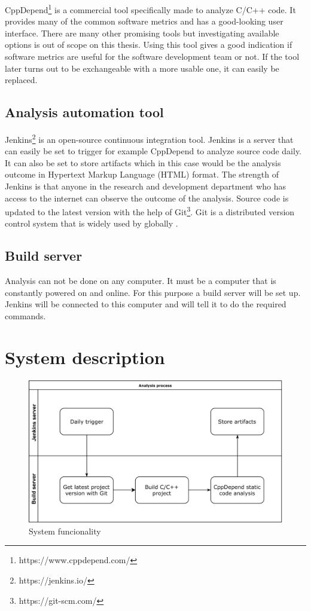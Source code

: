 CppDepend\footnote{https://www.cppdepend.com/} is a commercial tool specifically made to analyze C/C++ code. It provides many of the common software metrics and has a good-looking user interface. There are many other promising tools but investigating available options is out of scope on this thesis. Using this tool gives a good indication if software metrics are useful for the software development team or not. If the tool later turns out to be exchangeable with a more usable one, it can easily be replaced.

\subsection{Analysis automation tool}

Jenkins\footnote{https://jenkins.io/} is an open-source continuous integration tool. Jenkins is a server that can easily be set to trigger for example CppDepend to analyze source code daily. It can also be set to store artifacts which in this case would be the analysis outcome in Hypertext Markup Language (HTML) format.  The strength of Jenkins is that anyone in the research and development department who has access to the internet can observe the outcome of the analysis. Source code is updated to the latest version with the help of Git\footnote{https://git-scm.com/}. Git is a distributed version control system that is widely used by globally \cite{gitsurvey}.

\subsection{Build server}

Analysis can not be done on any computer. It must be a computer that is constantly powered on and online. For this purpose a build server will be set up. Jenkins will be connected to this computer and will tell it to do the required commands.

\section{System description}

\begin{figure}[t!]
\centering
\includegraphics[scale=0.06]{systemdesc.png}
\caption{System funcionality}
\label{fig:systemdesc}
\end{figure}

